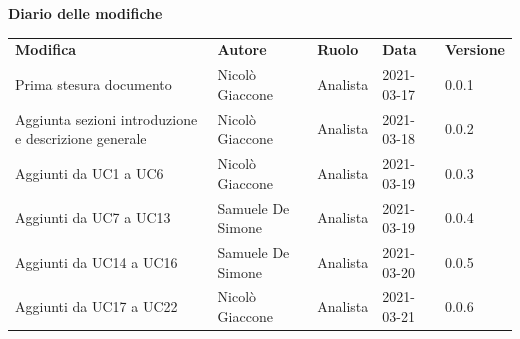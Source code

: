 \documentclass[a4paper]{article}
\begin{document}
    \begin{center}
        \textbf{\Large Diario delle modifiche}\\
        \vspace{10px}
        \begin{table}[h!]
        \centering
        \renewcommand{\arraystretch}{1.8}
        \begin{tabular}{p{150px} p{90px} p{50px} p{60px} p{45px}}
            \rowcolor{logo!70} \textbf{Modifica} & \textbf{Autore} & \textbf{Ruolo} & \textbf{Data} & \textbf{Versione}\\
            Prima stesura documento & Nicolò Giaccone & Analista & 2021-03-17 & 0.0.1 \\
            Aggiunta sezioni introduzione \newline e descrizione generale & Nicolò Giaccone & Analista & 2021-03-18 & 0.0.2 \\    
            Aggiunti da UC1 a UC6 & Nicolò Giaccone & Analista & 2021-03-19 & 0.0.3 \\
            Aggiunti da UC7 a UC13 & Samuele De Simone & Analista & 2021-03-19 & 0.0.4 \\
            Aggiunti da UC14 a UC16 & Samuele De Simone & Analista & 2021-03-20 & 0.0.5 \\
            Aggiunti da UC17 a UC22 & Nicolò Giaccone & Analista & 2021-03-21 & 0.0.6 \\
        \end{tabular}
    \end{table}
    \end{center}

    \newpage
    \tableofcontents
    \listoffigures
    \newpage
    
    
    
    
\end{document}
